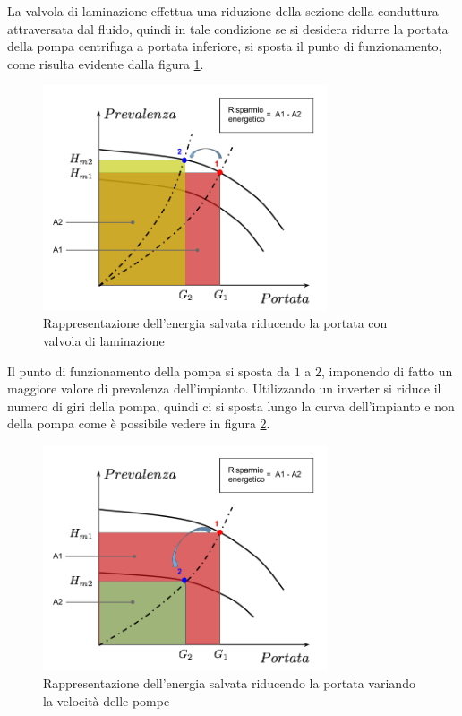 \documentclass[laurea,oneside,11pt]{USiena_tesiLM}
\begin{document}
La valvola di laminazione effettua una riduzione della sezione della conduttura attraversata dal fluido, quindi in tale condizione se si desidera ridurre la portata della pompa centrifuga a portata inferiore, si sposta il punto di funzionamento, come risulta evidente dalla figura \ref{fig:strozzatura}.

\begin{figure}[!ht]
\centering
\includegraphics[width=0.75\textwidth]{figure/strozzatura} 
\caption{Rappresentazione dell'energia salvata riducendo la portata con valvola di laminazione}
\label{fig:strozzatura}
\end{figure}

Il punto di funzionamento della pompa si sposta da $1$ a $2$, imponendo di fatto un maggiore valore di prevalenza dell'impianto. Utilizzando un inverter si riduce il numero di giri della pompa, quindi ci si sposta lungo la curva dell'impianto e non della pompa come è possibile vedere in figura \ref{fig:var_velocita}. 

\begin{figure}[!ht]
\centering
\includegraphics[width=0.75\textwidth]{figure/var_velocita} 
\caption{Rappresentazione dell'energia salvata riducendo la portata variando la velocità delle pompe}
\label{fig:var_velocita}
\end{figure}
\end{document}
